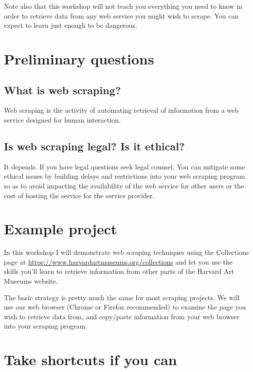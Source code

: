 \documentclass[]{book}
\begin{document}
Note also that this workshop will not teach you everything you need to
know in order to retrieve data from any web service you might wish to
scrape. You can expect to learn just enough to be dangerous.

\section{Preliminary questions}\label{preliminary-questions}

\subsection{What is web scraping?}\label{what-is-web-scraping}

Web scraping is the activity of automating retrieval of information from
a web service designed for human interaction.

\subsection{Is web scraping legal? Is it
ethical?}\label{is-web-scraping-legal-is-it-ethical}

It depends. If you have legal questions seek legal counsel. You can
mitigate some ethical issues by building delays and restrictions into
your web scraping program so as to avoid impacting the availability of
the web service for other users or the cost of hosting the service for
the service provider.

\section{Example project}\label{example-project-1}

In this workshop I will demonstrate web scraping techniques using the
Collections page at \url{https://www.harvardartmuseums.org/collections}
and let you use the skills you'll learn to retrieve information from
other parts of the Harvard Art Museums website.

The basic strategy is pretty much the same for most scraping projects.
We will use our web browser (Chrome or Firefox recommended) to examine
the page you wish to retrieve data from, and copy/paste information from
your web browser into your scraping program.

\section{Take shortcuts if you can}\label{take-shortcuts-if-you-can}
\end{document}
